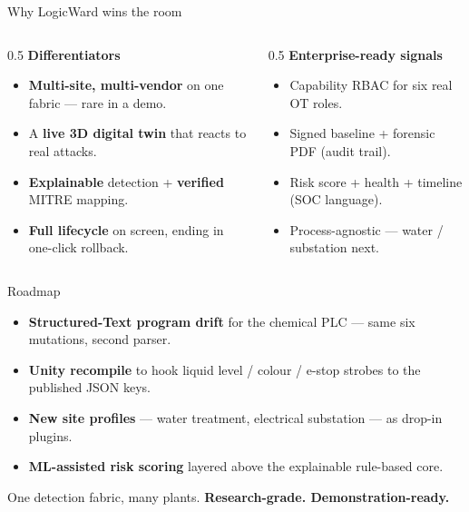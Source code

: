 \documentclass[aspectratio=169,11pt]{beamer}
\newcommand{\hl}[1]{{\color{accent}\textbf{#1}}}
\begin{document}
\begin{frame}{Why LogicWard wins the room}
\begin{columns}[T]
\begin{column}{0.5\textwidth}
\textbf{\color{navy}Differentiators}
\begin{itemize}\small
  \item \hl{Multi-site, multi-vendor} on one fabric --- rare in a demo.
  \item A \hl{live 3D digital twin} that reacts to real attacks.
  \item \hl{Explainable} detection + \hl{verified} MITRE mapping.
  \item \hl{Full lifecycle} on screen, ending in one-click rollback.
\end{itemize}
\end{column}
\begin{column}{0.5\textwidth}
\textbf{\color{navy}Enterprise-ready signals}
\begin{itemize}\small
  \item Capability RBAC for six real OT roles.
  \item Signed baseline + forensic PDF (audit trail).
  \item Risk score + health + timeline (SOC language).
  \item Process-agnostic --- water / substation next.
\end{itemize}
\end{column}
\end{columns}
\end{frame}

\begin{frame}{Roadmap}
\begin{itemize}
  \item \hl{Structured-Text program drift} for the chemical PLC --- same six mutations, second parser.
  \item \hl{Unity recompile} to hook liquid level / colour / e-stop strobes to the published JSON keys.
  \item \hl{New site profiles} --- water treatment, electrical substation --- as drop-in plugins.
  \item \hl{ML-assisted risk scoring} layered above the explainable rule-based core.
\end{itemize}
\vspace{10pt}
\begin{block}{}
\centering One detection fabric, many plants. \hl{Research-grade. Demonstration-ready.}
\end{block}
\end{frame}
\end{document}
